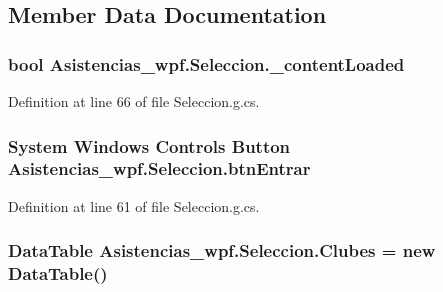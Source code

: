 \subsection{Member Data Documentation}
\hypertarget{class_asistencias__wpf_1_1_seleccion_a6ae4d9df3b32fa06ca84cb541dc05e7b}{
\subsubsection[{\-\_\-content\-Loaded}]{\setlength{\rightskip}{0pt plus 5cm}bool Asistencias\-\_\-wpf.\-Seleccion.\-\_\-content\-Loaded\hspace{0.3cm}{\ttfamily [private]}}}\label{class_asistencias__wpf_1_1_seleccion_a6ae4d9df3b32fa06ca84cb541dc05e7b}


Definition at line 66 of file Seleccion.\-g.\-cs.

\hypertarget{class_asistencias__wpf_1_1_seleccion_a7c5e0a561a721c40c2173b532d0995cf}{
\subsubsection[{btn\-Entrar}]{\setlength{\rightskip}{0pt plus 5cm}System Windows Controls Button Asistencias\-\_\-wpf.\-Seleccion.\-btn\-Entrar\hspace{0.3cm}{\ttfamily [package]}}}\label{class_asistencias__wpf_1_1_seleccion_a7c5e0a561a721c40c2173b532d0995cf}


Definition at line 61 of file Seleccion.\-g.\-cs.

\hypertarget{class_asistencias__wpf_1_1_seleccion_a3b40e4f06a7c3351ed5f1e8d30cd6ae8}{
\subsubsection[{Clubes}]{\setlength{\rightskip}{0pt plus 5cm}Data\-Table Asistencias\-\_\-wpf.\-Seleccion.\-Clubes = new Data\-Table()\hspace{0.3cm}{\ttfamily [private]}}}\label{class_asistencias__wpf_1_1_seleccion_a3b40e4f06a7c3351ed5f1e8d30cd6ae8}


